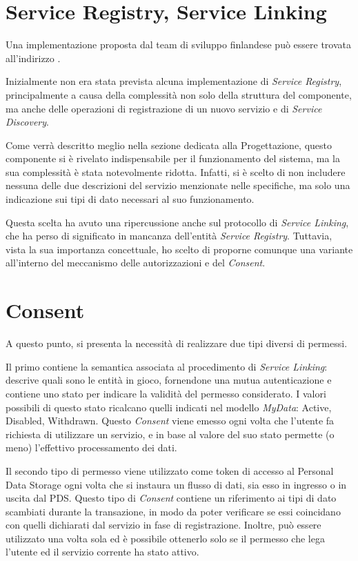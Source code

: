 \section{Service Registry, Service Linking}
Una implementazione proposta dal team di sviluppo finlandese pu\`o essere trovata all’indirizzo \cite{githubmydataserviceregistry}. 

Inizialmente non era stata prevista alcuna implementazione di \textit{Service Registry}, principalmente a causa della complessit\`a non solo della struttura del componente, ma anche delle operazioni di registrazione di un nuovo servizio e di \textit{Service Discovery}.

Come verr\`a descritto meglio nella sezione dedicata alla Progettazione, questo componente si \`e rivelato indispensabile per il funzionamento del sistema, ma la sua complessit\`a \`e stata notevolmente ridotta. Infatti, si \`e scelto di non includere nessuna delle due descrizioni del servizio menzionate nelle specifiche, ma solo una indicazione sui tipi di dato necessari al suo funzionamento.

Questa scelta ha avuto una ripercussione anche sul protocollo di \textit{Service Linking}, che ha perso di significato in mancanza dell’entit\`a \textit{Service Registry}. Tuttavia, vista la sua importanza concettuale, ho scelto di proporne comunque una variante all’interno del meccanismo delle autorizzazioni e del \textit{Consent}.

\section{Consent}
\label{sec:A-Consent}
A questo punto, si presenta la necessit\`a di realizzare due tipi diversi di permessi.

Il primo contiene la semantica associata al procedimento di \textit{Service Linking}: descrive quali sono le entit\`a in gioco, fornendone una mutua autenticazione e contiene uno stato per indicare la validit\`a del permesso considerato. I valori possibili di questo stato ricalcano quelli indicati nel modello \textit{MyData}: Active, Disabled, Withdrawn. Questo \textit{Consent} viene emesso ogni volta che l’utente fa richiesta di utilizzare un servizio, e in base al valore del suo stato permette (o meno) l’effettivo processamento dei dati.

Il secondo tipo di permesso viene utilizzato come token di accesso al Personal Data Storage ogni volta che si instaura un flusso di dati, sia esso in ingresso o in uscita dal PDS. Questo tipo di \textit{Consent} contiene un riferimento ai tipi di dato scambiati durante la transazione, in modo da poter verificare se essi coincidano con quelli dichiarati dal servizio in fase di registrazione. Inoltre, pu\`o essere utilizzato una volta sola ed \`e possibile ottenerlo solo se il permesso che lega l’utente ed il servizio corrente ha stato attivo.

